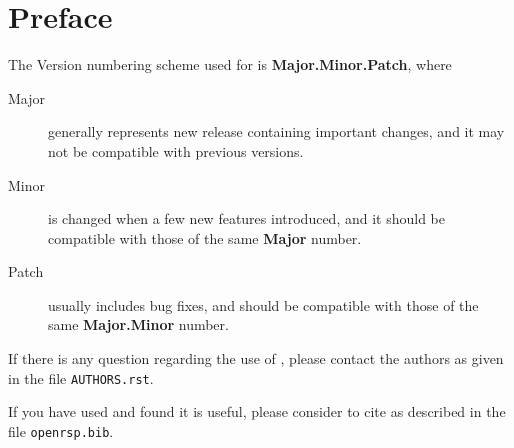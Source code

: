\documentclass{article}
\begin{document}
\clearpage

\tableofcontents

\clearpage

\pagestyle{noweb}

\section{Preface}

The Version numbering scheme used for
\LibName is \textbf{Major.Minor.Patch}, where
\begin{description}
  \item[Major] generally represents new release containing important changes,
    and it may not be compatible with previous versions.
  \item[Minor] is changed when a few new features introduced, and it should be
    compatible with those of the same \textbf{Major} number.
  \item[Patch] usually includes bug fixes, and should be compatible with those
    of the same \textbf{Major.Minor} number.
\end{description}

If there is any question regarding the use of \LibName, please contact
the authors as given in the file \texttt{AUTHORS.rst}.

If you have used \LibName and found it is useful, please consider to cite
\LibName as described in the file \texttt{openrsp.bib}.





\end{document}
